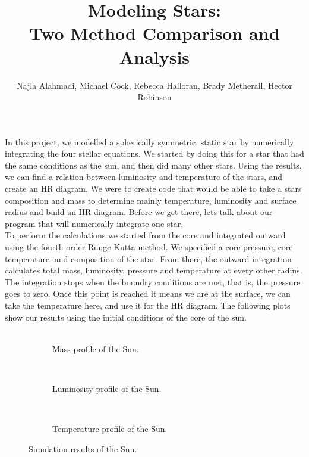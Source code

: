 \documentclass[10pt]{article}
\title{Modeling Stars: \\ Two Method Comparison and Analysis}
\author{Najla Alahmadi, Michael Cock, Rebecca Halloran, Brady Metherall, Hector Robinson}
\begin{document}
\maketitle

In this project, we modelled a spherically symmetric, static star by numerically integrating the four stellar equations. We started by doing this for a star that had the same conditions as the sun, and then did many other stars. Using the results, we can find a relation between luminosity and temperature of the stars, and create an HR diagram. We were to create code that would be able to take a stars composition and mass to determine mainly temperature, luminosity and surface radius and build an HR diagram. Before we get there, lets talk about our program that will numerically integrate one star. \\

To perform the calculations we started from the core and integrated outward using the fourth order Runge Kutta method. We specified a core pressure, core temperature, and composition of the star. From there, the outward integration calculates total mass, luminosity, pressure and temperature at every other radius. The integration stops when the boundry conditions are met, that is, the pressure goes to zero. Once this point is reached it means we are at the surface, we can take the temperature here, and use it for the HR diagram. The following plots show our results using the initial conditions of the core of the sun. \\
\

\begin{figure}[p]
\begin{centering}
 \begin{subfigure}{\textwidth}
  
  \caption{Mass profile of the Sun.}
 \end{subfigure} \\
 \begin{subfigure}{\textwidth}
  
  \caption{Luminosity profile of the Sun.}
 \end{subfigure} \\
  \begin{subfigure}{\textwidth}
  
  \caption{Temperature profile of the Sun.}
 \end{subfigure}
 \caption{Simulation results of the Sun.}
 \end{centering}
\end{figure}
\end{document}
